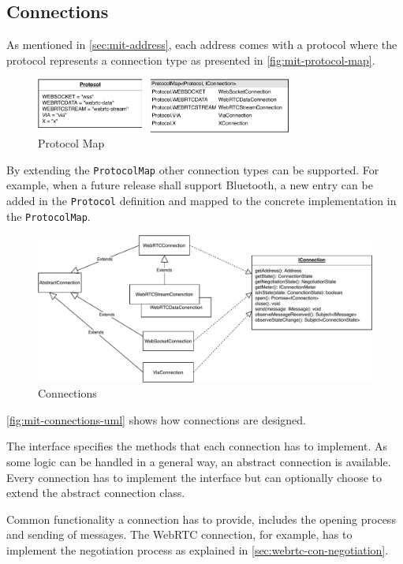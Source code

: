 \subsection{Connections}\label{sec:mit-connections}

As mentioned in \vref{sec:mit-address}, each address comes with a protocol where the protocol represents a connection type as presented in \vref{fig:mit-protocol-map}.

\begin{figure}
\centering
\includegraphics[width=0.75\textwidth]{graphics/implementation/mitosis-architecture-connections-protocol-map.pdf}
\caption{Protocol Map}
\label{fig:mit-protocol-map}
\end{figure}

By extending the \lstinline|ProtocolMap| other connection types can be supported. For example, when a future release shall support Bluetooth, a new entry can be added in the \lstinline|Protocol| definition and mapped to the concrete implementation in the \lstinline|ProtocolMap|.

\begin{figure}
\centering
\includegraphics[width=1\textwidth]{graphics/implementation/mitosis-architecture-connections.pdf}
\caption{Connections}
\label{fig:mit-connections-uml}
\end{figure}

\vref{fig:mit-connections-uml} shows how connections are designed.

The interface specifies the methods that each connection has to implement. As some logic can be handled in a general way, an abstract connection is available. Every connection has to implement the interface but can optionally choose to extend the abstract connection class.

Common functionality a connection has to provide, includes the opening process and sending of messages. The WebRTC connection, for example, has to implement the negotiation process as explained in \vref{sec:webrtc-con-negotiation}.
